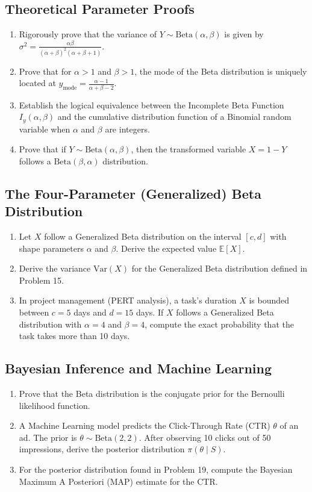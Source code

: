 \documentclass[11pt, a4paper]{article}
\theoremstyle{definition}
\theoremstyle{remark}
\newcommand{\E}{\mathbb{E}}
\begin{document}
\subsection{Theoretical Parameter Proofs}
\begin{enumerate}[label=\textbf{\arabic*.}, resume]
    \item Rigorously prove that the variance of $Y \sim \text{Beta}(\alpha, \beta)$ is given by $\sigma^2 = \frac{\alpha\beta}{(\alpha+\beta)^2(\alpha+\beta+1)}$.
    \item Prove that for $\alpha > 1$ and $\beta > 1$, the mode of the Beta distribution is uniquely located at $y_{\text{mode}} = \frac{\alpha-1}{\alpha+\beta-2}$.
    \item Establish the logical equivalence between the Incomplete Beta Function $I_y(\alpha, \beta)$ and the cumulative distribution function of a Binomial random variable when $\alpha$ and $\beta$ are integers.
    \item Prove that if $Y \sim \text{Beta}(\alpha, \beta)$, then the transformed variable $X = 1 - Y$ follows a $\text{Beta}(\beta, \alpha)$ distribution.
\end{enumerate}

\subsection{The Four-Parameter (Generalized) Beta Distribution}
\begin{enumerate}[label=\textbf{\arabic*.}, resume]
    \item Let $X$ follow a Generalized Beta distribution on the interval $[c, d]$ with shape parameters $\alpha$ and $\beta$. Derive the expected value $\E[X]$.
    \item Derive the variance $\text{Var}(X)$ for the Generalized Beta distribution defined in Problem 15.
    \item In project management (PERT analysis), a task's duration $X$ is bounded between $c = 5$ days and $d = 15$ days. If $X$ follows a Generalized Beta distribution with $\alpha = 4$ and $\beta = 4$, compute the exact probability that the task takes more than 10 days.
\end{enumerate}

\subsection{Bayesian Inference and Machine Learning}
\begin{enumerate}[label=\textbf{\arabic*.}, resume]
    \item Prove that the Beta distribution is the conjugate prior for the Bernoulli likelihood function.
    \item A Machine Learning model predicts the Click-Through Rate (CTR) $\theta$ of an ad. The prior is $\theta \sim \text{Beta}(2, 2)$. After observing 10 clicks out of 50 impressions, derive the posterior distribution $\pi(\theta \mid S)$.
    \item For the posterior distribution found in Problem 19, compute the Bayesian Maximum A Posteriori (MAP) estimate for the CTR.
\end{enumerate}
\end{document}
